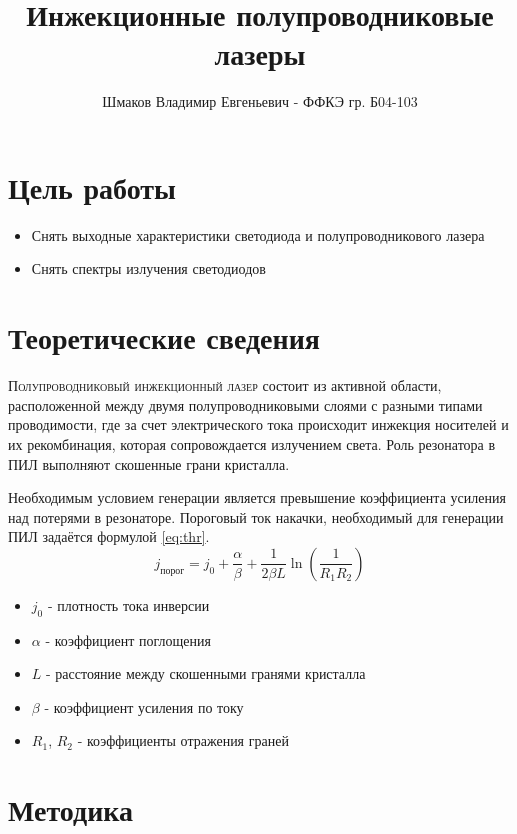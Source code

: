 \documentclass[a4paper, 12pt]{extarticle}
\title{\textcolor{main_title}{Инжекционные полупроводниковые лазеры}}
\author{Шмаков Владимир Евгеньевич - ФФКЭ гр. Б04-103}
\begin{document}
\maketitle



\section*{\textcolor{header}{Цель работы}}
\begin{itemize}
    \item Снять выходные характеристики светодиода и полупроводникового лазера
    \item Снять спектры излучения светодиодов
\end{itemize}
\section*{\textcolor{header}{Теоретические сведения}}

\lettrine{\textcolor{defenition}{П}}{\textcolor{defenition}{олупроводниковый инжекционный лазер}} состоит из активной области, расположенной между двумя полупроводниковыми слоями с разными типами проводимости, где за счет электрического тока происходит инжекция носителей и их рекомбинация, которая сопровождается излучением  света. Роль резонатора в ПИЛ выполняют скошенные грани кристалла.

Необходимым условием генерации является превышение коэффициента усиления над потерями в резонаторе. Пороговый ток накачки, необходимый для генерации ПИЛ задаётся формулой \ref{eq:thr}.
\begin{equation}
    j_{\text{порог}} = j_0 + \frac{\alpha}{\beta} + \frac{1}{2 \beta L} \operatorname{ln}\left( \frac{1}{R_1 R_2}\right)
    \label{eq:thr}
\end{equation}
\begin{itemize}
    \item $j_0$ - плотность тока инверсии
    \item $\alpha$ - коэффициент поглощения
    \item $L$ - расстояние между скошенными гранями кристалла
    \item $\beta$ - коэффициент усиления по току
    \item $R_1$, $R_2$ - коэффициенты отражения граней
\end{itemize}





\section*{\textcolor{header}{Методика}}
\end{document}
